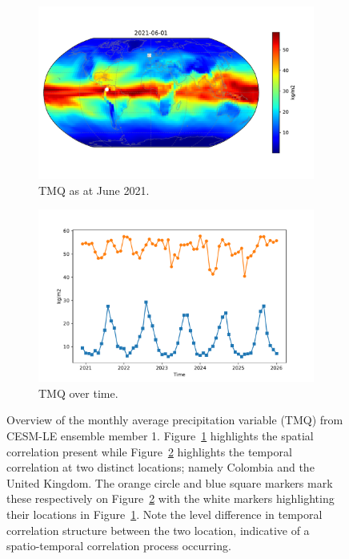 \begin{figure}[htbp!] 
	\centering
	\begin{subfigure}[b]{0.45\textwidth}
		\includegraphics[width=\textwidth]{TMQ_example}
		\caption{TMQ as at June 2021.}
		\label{fig:precip_june}   
	\end{subfigure}             
	\begin{subfigure}[b]{0.45\textwidth}
		\includegraphics[width=\textwidth]{TMQ_example_temp}
		\caption{TMQ over time.}
		\label{fig:precip_temp}
	\end{subfigure}             
	\caption[Overview of Precipitation variable]{Overview of the monthly average precipitation variable (TMQ) from CESM-LE ensemble member 1. Figure~\ref{fig:precip_june} highlights the spatial correlation present while Figure~\ref{fig:precip_temp} highlights the temporal correlation at two distinct locations; namely Colombia and the United Kingdom. The orange circle and blue square markers mark these respectively on Figure~\ref{fig:precip_temp} with the white markers highlighting their locations in Figure~\ref{fig:precip_june}. Note the level difference in temporal correlation structure between the two location, indicative of a spatio-temporal correlation process occurring.}
	\label{fig:precip_overview}
\end{figure}

